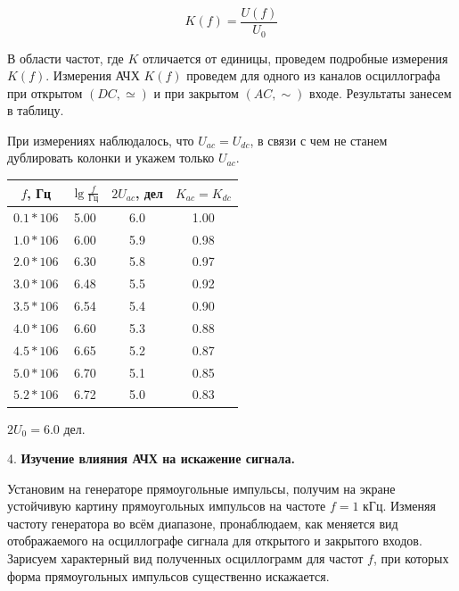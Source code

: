 \documentclass[14pt]{article}
\begin{document}
$$K(f) = \frac{U(f)}{U_0}$$

В области частот, где $K$ отличается от единицы, проведем подробные измерения $K(f)$. Измерения АЧХ $K(f)$ проведем для одного из каналов осциллографа при открытом $(DC, \simeq)$ и при закрытом $(AC, \sim)$ входе. Результаты занесем в таблицу.

%
%

При измерениях наблюдалось, что $U_{ac} = U_{dc}$, в связи с чем не станем дублировать колонки и укажем только $U_{ac}$.

\begin{center}
\begin{tabular}{|c|c|c|c|}
\hline
$f$, Гц		&	$\lg \frac{f}{\text{Гц}}$	&	$2U_{ac}$, дел	&	$K_{ac} = K_{dc}$\\
\hline
$0.1*10{6}$	&	5.00						&	6.0				&	1.00\\
\hline
$1.0*10{6}$	&	6.00						&	5.9				&	0.98\\
\hline
$2.0*10{6}$	&	6.30						&	5.8				&	0.97\\
\hline
$3.0*10{6}$	&	6.48						&	5.5				&	0.92\\
\hline
$3.5*10{6}$	&	6.54						&	5.4				&	0.90\\
\hline
$4.0*10{6}$	&	6.60						&	5.3				&	0.88\\
\hline
$4.5*10{6}$	&	6.65						&	5.2				&	0.87\\
\hline
$5.0*10{6}$	&	6.70						&	5.1				&	0.85\\
\hline
$5.2*10{6}$	&	6.72						&	5.0				&	0.83\\
\hline
\end{tabular}
\end{center}

$2U_0 = 6.0$ дел.

%
%

\vspace{0.5cm}
4. \textbf{Изучение влияния АЧХ на искажение сигнала.}

Установим на генераторе прямоугольные импульсы, получим на экране устойчивую картину прямоугольных импульсов на частоте $f = 1$ кГц. Изменяя частоту генератора во всём диапазоне, пронаблюдаем, как меняется вид отображаемого на осциллографе сигнала для открытого и закрытого входов. Зарисуем характерный вид полученных осциллограмм для частот $f$, при которых форма прямоугольных импульсов существенно искажается. 

%
%
\end{document}

